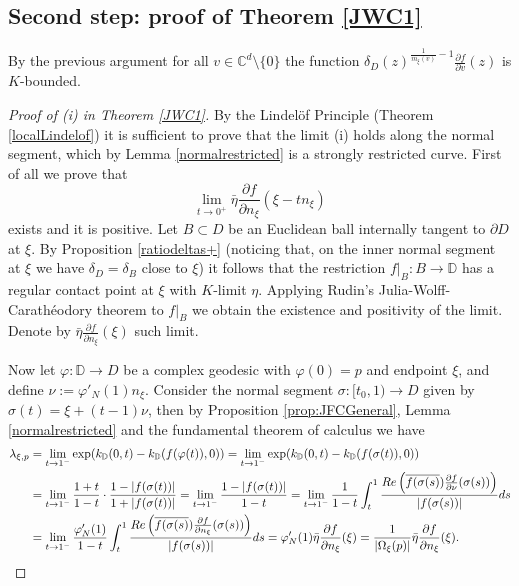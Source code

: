 \documentclass[11pt, reqno]{amsart}
\numberwithin{equation}{section}
\theoremstyle{definition}
\newcommand{\C}{\mathbb{C}}
\newcommand{\D}{\mathbb{D}}
\begin{document}
{{{		\subsection{Second step: proof of Theorem \ref{JWC1}}
		By the previous argument for all $v\in \C^d\setminus\{0\}$ the function $ \delta_D(z)^{\frac{1}{m_\xi(v)}-1}\frac{\partial f}{\partial v}(z)$ is $K$-bounded.
		\begin{proof}[Proof of (i) in Theorem \ref{JWC1}]
			By the Lindel\"of Principle (Theorem \ref{localLindelof}) it is sufficient to prove that the limit (i)   holds along the normal segment, which by Lemma \ref{normalrestricted} is a strongly restricted curve.
			First of all we prove that $$\lim_{t\to0^+}\bar{\eta}\frac{\partial f}{\partial n_\xi}(\xi-tn_\xi)$$
			exists and it is positive. Let $B\subset D$ be an Euclidean ball internally tangent to $\partial D$ at $\xi$. By Proposition \ref{ratiodeltas+} (noticing that, on the inner normal segment at $\xi$ we have $\delta_D=\delta_B$ close to $\xi$) it follows  that the restriction $f|_B\colon B\to \D$ has a regular contact point    at $\xi$ with $K$-limit $\eta$. Applying  Rudin's Julia-Wolff-Carath\'eodory theorem to $f|_B$ we obtain the existence and positivity of the limit. Denote by $\bar{\eta}\frac{\partial f}{\partial n_\xi}(\xi)$ such limit.
			
			Now let $\varphi\colon\D\to D$ be a complex geodesic with $\varphi(0)=p$ and endpoint $\xi$, and define $\nu:=\varphi'_N(1)n_\xi$. Consider the normal segment $\sigma\colon[t_0,1)\to D$ given by $\sigma(t)=\xi+(t-1)\nu$, then by Proposition \ref{prop:JFCGeneral}, Lemma \ref{normalrestricted} and the fundamental theorem of calculus  we have
			\begin{align*}
				\lambda_{\xi,p}&=\lim_{t\to1^-}\exp(k_\D(0,t)-k_\D(f(\varphi(t)),0))=\lim_{t\to1^-}\exp(k_\D(0,t)-k_\D(f(\sigma(t)),0))\\&=\lim_{t\to1^-}\frac{1+t}{1-t}\cdot\frac{1-|f(\sigma(t))|}{1+|f(\sigma(t))|} =\lim_{t\to1^-}\frac{1-|f(\sigma(t))|}{1-t} =\lim_{t\to1^-}\frac{1}{1-t}\int_t^1\frac{{\rm Re}\left(\overline{f(\sigma(s)})\frac{\partial f}{\partial \nu}(\sigma(s))\right)}{|f(\sigma(s))|}ds\\& =\lim_{t\to1^-}\frac{\varphi_N'(1)}{1-t}\int_t^1\frac{{\rm Re}\left(\overline{f(\sigma(s)})\frac{\partial f}{\partial n_\xi}(\sigma(s))\right)}{|f(\sigma(s))|}ds=\varphi_N'(1)\bar{\eta}\frac{\partial f}{\partial n_\xi}(\xi)=\frac{1}{|\Omega_\xi(p)|}\bar{\eta}\frac{\partial f}{\partial n_\xi}(\xi).
			\end{align*}
		\end{proof}
		
}}}
\end{document}
